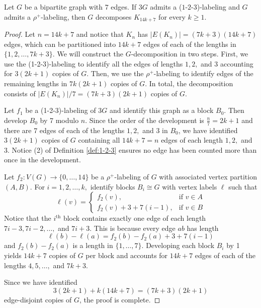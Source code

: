 \begin{thm}\label{thm:1-2-3 plus rho}
    Let $G$ be a bipartite graph with $7$ edges. If $3G$ admits a ($1$-$2$-$3$)-labeling and $G$ admits a $\rho^{+}$-labeling, then $G$ decomposes $K_{14k+7}$ for every $k\geq 1.$
\end{thm}
\begin{proof}
    Let $n=14k+7$ and notice that $K_n$ has $|E(K_n)|=(7k+3)(14k+7)$ edges, which can be partitioned into $14k+7$ edges of each of the lengths in $\{1,2,\dots,7k+3\}.$  We will construct the $G$-decomposition in two steps. First, we use the (1-2-3)-labeling to identify all the edges of lengths $1,2,$ and $3$ accounting for $3(2k+1)$ copies of $G$. Then, we use the $\rho^{+}$-labeling to identify edges of the remaining lengths in $7k(2k+1)$ copies of $G$. In total, the decomposition consists of $|E(K_n)|/7=(7k+3)(2k+1)$ copies of $G.$

    Let $f_1$ be a (1-2-3)-labeling of $3G$ and identify this graph as a block $B_0$. Then develop $B_0$ by 7 modulo $n$. Since the order of the development is $\frac{n}{7}=2k+1$ and there are 7 edges of each of the lengths $1,2,$ and $3$ in $B_0$, we have identified $3(2k+1)$ copies of $G$ containing all $14k+7=n$ edges of each length $1,2,$ and $3$. Notice (2) of Definition \ref{def:1-2-3} ensures no edge has been counted more than once in the development.

    Let $f_2:V(G) \rightarrow \{0,\dots,14\}$ be a $\rho^{+}$-labeling of $G$ with associated vertex partition $(A,B).$ For $i=1,2,\dots,k,$ identify blocks $B_i \cong G$ with vertex labels $\ell$ such that
    \[
    \ell(v)=
    \begin{cases}
        f_2(v), & \textrm{if } v \in A \\
        f_2(v)+3+7(i-1), & \textrm{if } v \in B
    \end{cases}
    \]
    Notice that the $i^{\textrm{th}}$ block contains exactly one edge of each length $7i-3,7i-2, \dots,$ and $ 7i+3.$ This is because every edge $ab$ has length 
    \[
    \ell(b)-\ell(a)=f_2(b)-f_2(a)+3+7(i-1)
    \]
    and $f_2(b)-f_2(a)$ is a length in $\{1,\dots,7\}.$
    Developing each block $B_i$ by 1 yields $14k+7$ copies of $G$ per block and accounts for $14k+7$ edges of each of the lengths $4,5,\dots,$ and $7k+3$.

    Since we have identified
    \[
    3(2k+1)+k(14k+7)=(7k+3)(2k+1)
    \]
    edge-disjoint copies of $G$, the proof is complete.

\end{proof}

